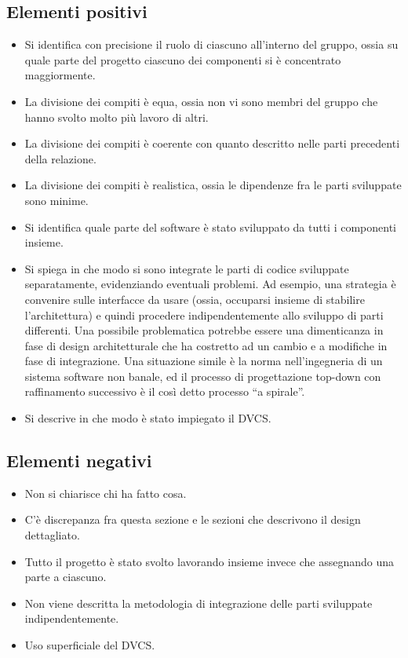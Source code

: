 \documentclass[a4paper,12pt]{report}
\begin{document}
\subsection*{Elementi positivi}

\begin{itemize}
	\item Si identifica con precisione il ruolo di ciascuno all'interno del gruppo, ossia su quale parte del progetto ciascuno dei componenti si è concentrato maggiormente.
	\item La divisione dei compiti è equa, ossia non vi sono membri del gruppo che hanno svolto molto più lavoro di altri.
	\item La divisione dei compiti è coerente con quanto descritto nelle parti precedenti della relazione.
	\item La divisione dei compiti è realistica, ossia le dipendenze fra le parti sviluppate sono minime.
	\item Si identifica quale parte del software è stato sviluppato da tutti i componenti insieme.
	\item Si spiega in che modo si sono integrate le parti di codice sviluppate separatamente, evidenziando eventuali problemi. Ad esempio, una strategia è convenire sulle interfacce da usare (ossia, occuparsi insieme di stabilire l'architettura) e quindi procedere indipendentemente allo sviluppo di parti differenti. Una possibile problematica potrebbe essere una dimenticanza in fase di design architetturale che ha costretto ad un cambio e a modifiche in fase di integrazione. Una situazione simile è la norma nell'ingegneria di un sistema software non banale, ed il processo di progettazione top-down con raffinamento successivo è il così detto processo ``a spirale''.
	\item Si descrive in che modo è stato impiegato il DVCS.
\end{itemize}

\subsection*{Elementi negativi}
\begin{itemize}
	\item Non si chiarisce chi ha fatto cosa.
	\item C'è discrepanza fra questa sezione e le sezioni che descrivono il design dettagliato.
	\item Tutto il progetto è stato svolto lavorando insieme invece che assegnando una parte a ciascuno.
	\item Non viene descritta la metodologia di integrazione delle parti sviluppate indipendentemente.
	\item Uso superficiale del DVCS.
\end{itemize}
\end{document}
